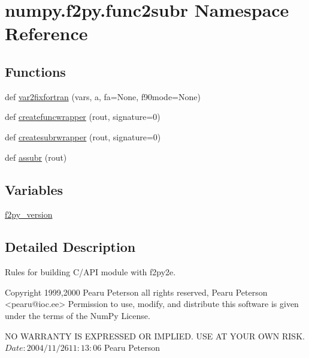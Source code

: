 \hypertarget{namespacenumpy_1_1f2py_1_1func2subr}{}\section{numpy.\+f2py.\+func2subr Namespace Reference}
\label{namespacenumpy_1_1f2py_1_1func2subr}
\subsection*{Functions}
\begin{DoxyCompactItemize}
\item 
def \hyperlink{namespacenumpy_1_1f2py_1_1func2subr_a85e80fcacd1bf82025cec2b75d280074}{var2fixfortran} (vars, a, fa=None, f90mode=None)
\item 
def \hyperlink{namespacenumpy_1_1f2py_1_1func2subr_a2eba0441618bc54318b61d069c6c9796}{createfuncwrapper} (rout, signature=0)
\item 
def \hyperlink{namespacenumpy_1_1f2py_1_1func2subr_abbf6c421dd4b66142e98335298a7c31c}{createsubrwrapper} (rout, signature=0)
\item 
def \hyperlink{namespacenumpy_1_1f2py_1_1func2subr_a0f1d6e305e6cd11741bcf08d15448bd4}{assubr} (rout)
\end{DoxyCompactItemize}
\subsection*{Variables}
\begin{DoxyCompactItemize}
\item 
\hyperlink{namespacenumpy_1_1f2py_1_1func2subr_a65d34358b5e05550a64a1f804894e4be}{f2py\+\_\+version}
\end{DoxyCompactItemize}


\subsection{Detailed Description}
\begin{DoxyVerb}Rules for building C/API module with f2py2e.

Copyright 1999,2000 Pearu Peterson all rights reserved,
Pearu Peterson <pearu@ioc.ee>
Permission to use, modify, and distribute this software is given under the
terms of the NumPy License.

NO WARRANTY IS EXPRESSED OR IMPLIED.  USE AT YOUR OWN RISK.
$Date: 2004/11/26 11:13:06 $
Pearu Peterson\end{DoxyVerb}
 

